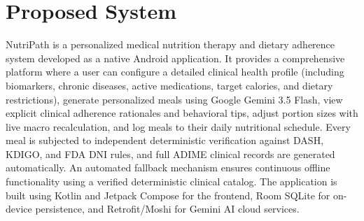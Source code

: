 \documentclass[a4paper,12pt]{report}
\begin{document}
\section{Proposed System}
\par NutriPath is a personalized medical nutrition therapy and dietary adherence system developed as a native Android application. It provides a comprehensive platform where a user can configure a detailed clinical health profile (including biomarkers, chronic diseases, active medications, target calories, and dietary restrictions), generate personalized meals using Google Gemini 3.5 Flash, view explicit clinical adherence rationales and behavioral tips, adjust portion sizes with live macro recalculation, and log meals to their daily nutritional schedule. Every meal is subjected to independent deterministic verification against DASH, KDIGO, and FDA DNI rules, and full ADIME clinical records are generated automatically. An automated fallback mechanism ensures continuous offline functionality using a verified deterministic clinical catalog. The application is built using Kotlin and Jetpack Compose for the frontend, Room SQLite for on-device persistence, and Retrofit/Moshi for Gemini AI cloud services.
\end{document}
